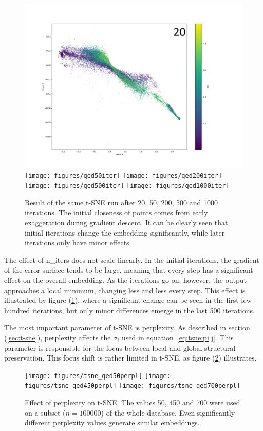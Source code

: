 \begin{figure}[!h]
	\centering
	\includegraphics[width=0.45\columnwidth]{figures/qed20iter}
	\texttt{[image: figures/qed50iter]}
	\texttt{[image: figures/qed200iter]}
	\texttt{[image: figures/qed500iter]}
	\texttt{[image: figures/qed1000iter]}
	\caption{Result of the same t-SNE run after 20, 50, 200, 500 and 1000 iterations. The initial closeness of points comes from early exaggeration during gradient descent. It can be clearly seen that initial iterations change the embedding significantly, while later iterations only have minor effects.}
	\label{fig:tsne:iter_sweep}
\end{figure}

The effect of n\_iters does not scale linearly. In the initial iterations, the gradient of the error surface tends to be large, meaning that every step has a significant effect on the overall embedding. As the iterations go on, however, the output approaches a local minimum, changing less and less every step. This effect is illustrated by figure (\ref{fig:tsne:iter_sweep}), where a significant change can be seen in the first few hundred iterations, but only minor differences emerge in the last 500 iterations.

The most important parameter of t-SNE is perplexity. As described in section (\ref{sec:t-sne}), perplexity affects the $\sigma_i$ used in equation~\eqref{eq:tsne:pi|j}. This parameter is responsible for the focus between local and global structural preservation. This focus shift is rather limited in t-SNE, as figure (\ref{fig:tsne:perplexity}) illustrates.

\begin{figure}[!h]
	\centering
	\texttt{[image: figures/tsne\_qed50perpl]}
	\texttt{[image: figures/tsne\_qed450perpl]}
	\texttt{[image: figures/tsne\_qed700perpl]}
	\caption{Effect of perplexity on t-SNE. The values 50, 450 and 700 were used on a subset ($n = 100000$) of the whole database. Even significantly different perplexity values generate similar embeddings.}
	\label{fig:tsne:perplexity}
\end{figure}

